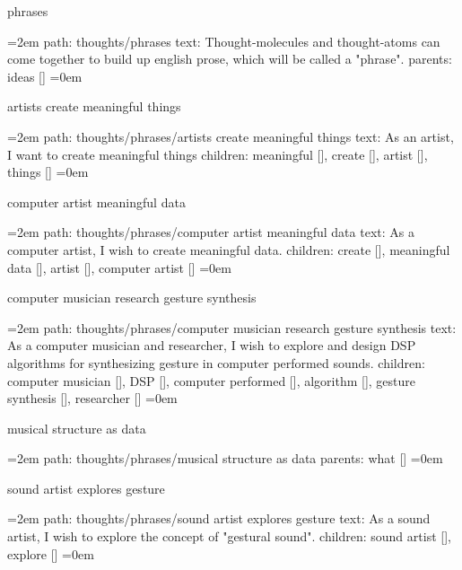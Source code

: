 \bigskip
{}
phrases
\smallskip
\par\begingroup
\leftskip=2em
path: thoughts/phrases
\smallskip
text:  Thought-molecules and thought-atoms can come together to build up english prose, which will be called a "phrase".
\smallskip
parents:  ideas []
\smallskip
\leftskip=0em
\par\endgroup
\bigskip
{}
artists create meaningful things
\smallskip
\par\begingroup
\leftskip=2em
path: thoughts/phrases/artists create meaningful things
\smallskip
text:  As an artist, I want to create meaningful things
\smallskip
children: meaningful [], create [], artist [], things []
\smallskip
\leftskip=0em
\par\endgroup
\bigskip
{}
computer artist meaningful data
\smallskip
\par\begingroup
\leftskip=2em
path: thoughts/phrases/computer artist meaningful data
\smallskip
text:  As a computer artist, I wish to create meaningful data.
\smallskip
children: create [], meaningful data [], artist [], computer artist []
\smallskip
\leftskip=0em
\par\endgroup
\bigskip
{}
computer musician research gesture synthesis
\smallskip
\par\begingroup
\leftskip=2em
path: thoughts/phrases/computer musician research gesture synthesis
\smallskip
text:  As a computer musician and researcher, I wish to explore and design DSP algorithms for synthesizing gesture in computer performed sounds.
\smallskip
children: computer musician [], DSP [], computer performed [], algorithm [], gesture synthesis [], researcher []
\smallskip
\leftskip=0em
\par\endgroup
\bigskip
{}
musical structure as data
\smallskip
\par\begingroup
\leftskip=2em
path: thoughts/phrases/musical structure as data
\smallskip
parents:  what []
\smallskip
\leftskip=0em
\par\endgroup
\bigskip
{}
sound artist explores gesture
\smallskip
\par\begingroup
\leftskip=2em
path: thoughts/phrases/sound artist explores gesture
\smallskip
text:  As a sound artist, I wish to explore the concept of "gestural sound".
\smallskip
children: sound artist [], explore []
\smallskip
\leftskip=0em
